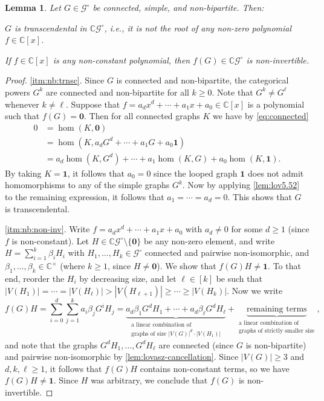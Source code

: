 \documentclass[11pt]{scrartcl}
\theoremstyle{definition}
\theoremstyle{plain}
\newtheorem{lemma}[definition]{Lemma}
\theoremstyle{remark}
\newcommand{\lG}{\mathcal{G}^\circ}
\newcommand{\C}{\mathbb{C}}
\begin{document}
	
	\begin{lemma}
		\label{lem:non-bipartite}
		Let $G \in \lG$ be connected, simple, and non-bipartite.
		Then:
		\begin{assertions}
			\item\label{itm:nb:trnsc} $G$ is transcendental in $\C\lG$, i.e., it is not the root of any non-zero polynomial $f \in \C[x]$.
			\item\label{itm:nb:non-inv} If $f \in \C[x]$ is any non-constant polynomial, then $f(G) \in \C\lG$ is non-invertible.
		\end{assertions}
	\end{lemma}
	\begin{proof}
		\ref{itm:nb:trnsc}.
		Since $G$ is connected and non-bipartite, the categorical powers $G^k$ are connected and non-bipartite for all $k \geq 0$.
		Note that $G^k \neq G^\ell$ whenever $k \neq \ell$.
		Suppose that $f = a_d x^d + \cdots + a_1 x + a_0 \in \C[x]$ is a polynomial such that $f(G) = \boldsymbol{0}$.
		Then for all connected graphs $K$ we have by \cref{eq:connected}
		\begin{align*}
			0 &= \hom(K,\boldsymbol{0}) \\
			&= \hom(K,a_d G^d + \cdots + a_1 G + a_0 \boldsymbol{1}) \\
			&= a_d \hom(K,G^d) + \cdots + a_1 \hom(K,G) + a_0 \hom(K,\boldsymbol{1}).
		\end{align*}
		By taking $K = \boldsymbol{1}$, it follows that $a_0 = 0$ since the looped graph $\boldsymbol{1}$ does not admit homomorphisms to any of the simple graphs $G^k$.
		Now by applying \cref{lem:lov5.52} to the remaining expression, it follows that $a_1 = \cdots = a_d = 0$.
		This shows that $G$ is transcendental.
		
		\ref{itm:nb:non-inv}.
		Write $f = a_d x^d + \cdots + a_1 x + a_0$ with $a_d \neq 0$ for some $d \geq 1$ (since $f$ is non-constant).
		Let $H \in \C\lG \setminus \{\boldsymbol{0}\}$ be any non-zero element, and write $H = \sum_{i=1}^k \beta_i H_i$ with $H_1,\ldots,H_k \in \lG$ connected and pairwise non-isomorphic, and $\beta_1,\ldots,\beta_k \in \C^\times$ (where $k \geq 1$, since $H \neq \boldsymbol{0}$).
		We show that $f(G)H \neq \boldsymbol{1}$.
		To that end, reorder the $H_i$ by decreasing size, and let $\ell \in [k]$ be such that $|V(H_1)| = \cdots = |V(H_\ell)| > |V(H_{\ell+1})| \geq \cdots \geq |V(H_k)|$.
		Now we write
		\[ f(G)H = \sum_{i=0}^d \sum_{j=1}^k a_i \beta_j G^i H_j = \underbrace{a_d \beta_1 G^d H_1 + \cdots + a_d \beta_\ell G^d H_\ell}_{\substack{\text{a linear combination of}\\\text{graphs of size $|V(G)|^d \cdot |V(H_1)|$}}} + \underbrace{\text{remaining terms}}_{\substack{\text{a linear combination of}\\\text{graphs of strictly smaller size}}}, \]
		and note that the graphs $G^d H_1 , \ldots , G^d H_\ell$ are connected (since $G$ is non-bipartite) and pairwise non-isomorphic by \cref{lem:lovasz-cancellation}.
		Since $|V(G)| \geq 3$ and $d,k,\ell \geq 1$, it follows that $f(G)H$ contains non-constant terms, so we have $f(G)H \neq \boldsymbol{1}$.
		Since $H$ was arbitrary, we conclude that $f(G)$ is non-invertible.
	\end{proof}
	
\end{document}
